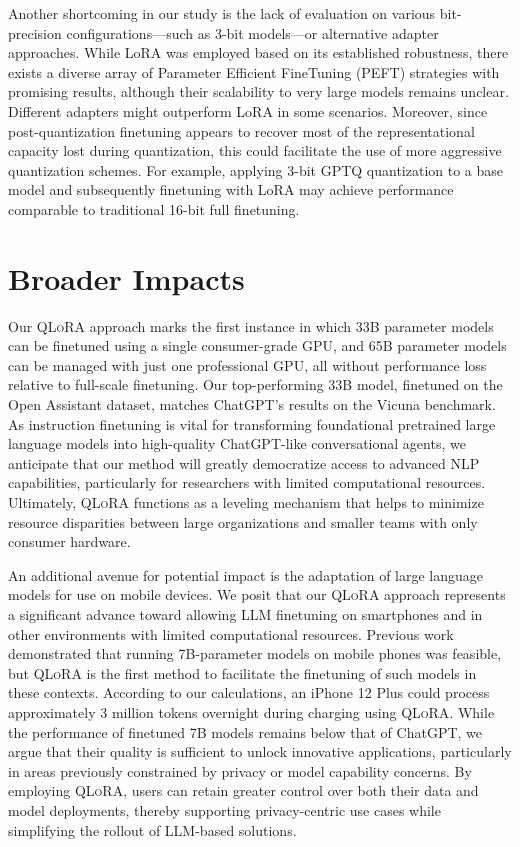 Another shortcoming in our study is the lack of evaluation on various bit-precision configurations—such as 3-bit models—or alternative adapter approaches. While LoRA was employed based on its established robustness, there exists a diverse array of Parameter Efficient FineTuning (PEFT) strategies with promising results, although their scalability to very large models remains unclear. Different adapters might outperform LoRA in some scenarios. Moreover, since post-quantization finetuning appears to recover most of the representational capacity lost during quantization, this could facilitate the use of more aggressive quantization schemes. For example, applying 3-bit GPTQ quantization to a base model and subsequently finetuning with LoRA may achieve performance comparable to traditional 16-bit full finetuning.

\section{Broader Impacts}

Our \textsc{QLoRA} approach marks the first instance in which 33B parameter models can be finetuned using a single consumer-grade GPU, and 65B parameter models can be managed with just one professional GPU, all without performance loss relative to full-scale finetuning. Our top-performing 33B model, finetuned on the Open Assistant dataset, matches ChatGPT’s results on the Vicuna benchmark. As instruction finetuning is vital for transforming foundational pretrained large language models into high-quality ChatGPT-like conversational agents, we anticipate that our method will greatly democratize access to advanced NLP capabilities, particularly for researchers with limited computational resources. Ultimately, \textsc{QLoRA} functions as a leveling mechanism that helps to minimize resource disparities between large organizations and smaller teams with only consumer hardware.

An additional avenue for potential impact is the adaptation of large language models for use on mobile devices. We posit that our \textsc{QLoRA} approach represents a significant advance toward allowing LLM finetuning on smartphones and in other environments with limited computational resources. Previous work demonstrated that running 7B-parameter models on mobile phones was feasible, but \textsc{QLoRA} is the first method to facilitate the finetuning of such models in these contexts. According to our calculations, an iPhone 12 Plus could process approximately 3 million tokens overnight during charging using \textsc{QLoRA}. While the performance of finetuned 7B models remains below that of ChatGPT, we argue that their quality is sufficient to unlock innovative applications, particularly in areas previously constrained by privacy or model capability concerns. By employing \textsc{QLoRA}, users can retain greater control over both their data and model deployments, thereby supporting privacy-centric use cases while simplifying the rollout of LLM-based solutions.


